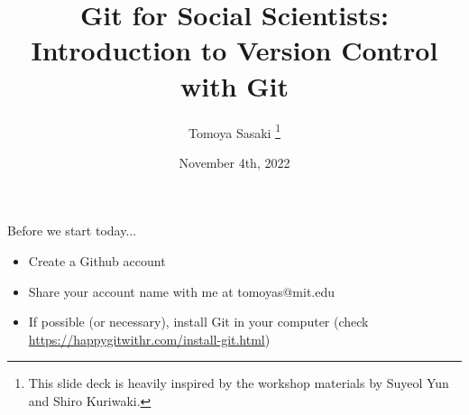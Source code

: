 \documentclass[handout,pdftex,10pt,aspectratio=169]{beamer}
\title[Git workshop]{Git for Social Scientists: Introduction to Version Control with Git}
\author[Tomoya]{Tomoya Sasaki%
\thanks{This slide deck is heavily inspired by the workshop materials by Suyeol Yun and Shiro Kuriwaki.}}
\institute[MIT]{Massachusetts Institute of Technology}
\date[Fall 2022]{November 4th, 2022}
\begin{document}
\begin{frame}{Before we start today...}
  \begin{itemize}
    \item Create a Github account
    \item Share your account name with me at tomoyas@mit.edu
    \item If possible (or necessary), install Git in your computer (check \url{https://happygitwithr.com/install-git.html})
  \end{itemize}
\end{frame}

\begin{frame}
  \titlepage
  \end{frame}
\end{document}
